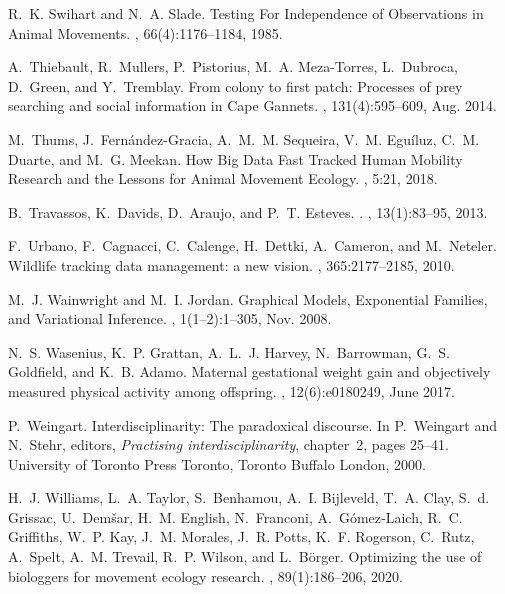 \documentclass[a4paper,12pt]{article}
\begin{document}
\begin{thebibliography}{10}
	R.~K. Swihart and N.~A. Slade.
	\newblock Testing {For} {Independence} of {Observations} in {Animal}
	{Movements}.
	, 66(4):1176--1184, 1985.
	
	A.~Thiebault, R.~Mullers, P.~Pistorius, M.~A. Meza-Torres, L.~Dubroca,
	D.~Green, and Y.~Tremblay.
	\newblock From colony to first patch: {Processes} of prey searching and social
	information in {Cape} {Gannets}.
	, 131(4):595--609, Aug. 2014.
	
	M.~Thums, J.~Fernández-Gracia, A.~M.~M. Sequeira, V.~M. Eguíluz, C.~M.
	Duarte, and M.~G. Meekan.
	\newblock How {Big} {Data} {Fast} {Tracked} {Human} {Mobility} {Research} and
	the {Lessons} for {Animal} {Movement} {Ecology}.
	, 5:21, 2018.
	
	B.~Travassos, K.~Davids, D.~Araujo, and P.~T. Esteves.
	.
	,
	13(1):83--95, 2013.
	
	F.~Urbano, F.~Cagnacci, C.~Calenge, H.~Dettki, A.~Cameron, and M.~Neteler.
	\newblock Wildlife tracking data management: a new vision.
	, 365:2177--2185, 2010.
	
	M.~J. Wainwright and M.~I. Jordan.
	\newblock Graphical {Models}, {Exponential} {Families}, and {Variational}
	{Inference}.
	, 1(1–2):1--305,
	Nov. 2008.
	
	N.~S. Wasenius, K.~P. Grattan, A.~L.~J. Harvey, N.~Barrowman, G.~S. Goldfield,
	and K.~B. Adamo.
	\newblock Maternal gestational weight gain and objectively measured physical
	activity among offspring.
	, 12(6):e0180249, June 2017.
	
	P.~Weingart.
	\newblock Interdisciplinarity: The paradoxical discourse.
	\newblock In P.~Weingart and N.~Stehr, editors, {\em Practising
		interdisciplinarity}, chapter~2, pages 25--41. University of Toronto Press
	Toronto, Toronto Buffalo London, 2000.
	
	H.~J. Williams, L.~A. Taylor, S.~Benhamou, A.~I. Bijleveld, T.~A. Clay, S.~d.
	Grissac, U.~Demšar, H.~M. English, N.~Franconi, A.~Gómez‐Laich, R.~C.
	Griffiths, W.~P. Kay, J.~M. Morales, J.~R. Potts, K.~F. Rogerson, C.~Rutz,
	A.~Spelt, A.~M. Trevail, R.~P. Wilson, and L.~Börger.
	\newblock Optimizing the use of biologgers for movement ecology research.
	, 89(1):186--206, 2020.
	

\end{thebibliography}
\end{document}
